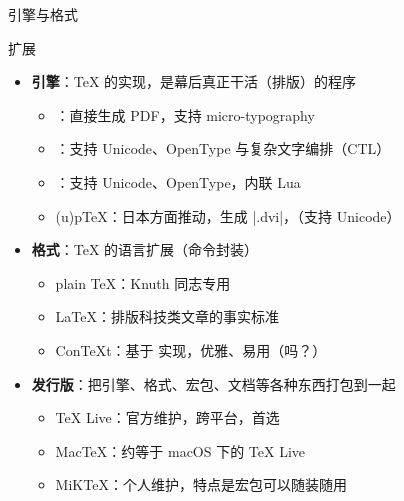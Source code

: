\begin{frame}[fragile]{引擎与格式}
  \vspace{-1em}
  \begin{block}{扩展}
    \begin{itemize}
      \item \textbf{引擎}：\TeX{} 的实现，是幕后真正干活（排版）的程序
            \begin{itemize}
              \item \pdfTeX{}：直接生成 PDF，支持 micro-typography
              \item \XeTeX{}：支持 Unicode、OpenType 与复杂文字编排（CTL）
              \item \LuaTeX{}：支持 Unicode、OpenType，内联 Lua
              \item (u)p\TeX{}：日本方面推动，生成 |.dvi|，（支持 Unicode）
            \end{itemize}
      \item \textbf{格式}：\TeX{} 的语言扩展（命令封装）
            \begin{itemize}
              \item plain \TeX{}：Knuth 同志专用
              \item \LaTeX{}：排版科技类文章的事实标准
              \item Con\TeX{t}：基于 \LuaTeX{} 实现，优雅、易用（吗？）
            \end{itemize}
      \item \textbf{发行版}：把引擎、格式、宏包、文档等各种东西打包到一起
            \begin{itemize}
              \item TeX Live：官方维护，跨平台，首选
              \item MacTeX：约等于 macOS 下的 TeX Live
              \item MiKTeX：个人维护，特点是宏包可以随装随用
            \end{itemize}
    \end{itemize}
  \end{block}
\end{frame}

